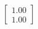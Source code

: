 \documentclass[preview]{standalone}
\begin{document}
\begin{align*}
\begin{bmatrix} 1.00 \\ 1.00 \end{bmatrix}
\end{align*}
\end{document}
